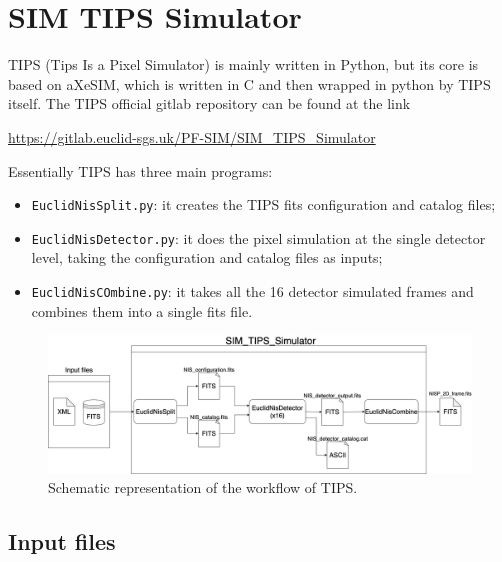\section{SIM TIPS Simulator}

TIPS (Tips Is a Pixel Simulator) is mainly written in Python, but its core is based on aXeSIM, which is written in C and then wrapped in python by TIPS itself. The TIPS official gitlab repository can be found at the link

\url{https://gitlab.euclid-sgs.uk/PF-SIM/SIM_TIPS_Simulator}

Essentially TIPS has three main programs:

\begin{itemize}
\item \verb+EuclidNisSplit.py+: it creates the TIPS fits configuration and catalog files;
\item \verb+EuclidNisDetector.py+: it does the pixel simulation at the single detector level, taking the configuration and catalog files as inputs;
\item \verb+EuclidNisCOmbine.py+: it takes all the 16 detector simulated frames and combines them into a single fits file.
\end{itemize}

\begin{figure}
    \centering
    \includegraphics[scale=0.25]{figures/TIPS_workflow.png}
    \caption{Schematic representation of the workflow of TIPS.}
    \label{fig:TIPS_workflow}
\end{figure}



\subsection{Input files}

